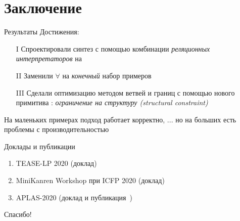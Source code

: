 \documentclass[aspectratio=169
  , xcolor={svgnames}
  , hyperref={ colorlinks,citecolor=Blue
             , linkcolor=DarkRed,urlcolor=DarkBlue}
  , russian
  ]{beamer}
\newcommand{\primi}[1]{\ensuremath{\mathbf{#1}}}
\newcommand{\ir}{\ensuremath{\mathcal{S}}}
\newcommand{\contributions}{
\begin{enumerate}
\item[I] Спроектировали синтез с помощью комбинации \emph{реляционных интерпретаторов} на \miniKanren{}
\item[II] Заменили $\forall$ на \emph{конечный} набор примеров
\item[III] Сделали оптимизацию методом ветвей и границ с помощью нового примитива \miniKanren{}: \emph{ограничение на структуру (structural constraint)}
\end{enumerate}
}
\begin{document}
\section{Заключение}

\begin{frame}{Результаты}%
Достижения: \contributions
\vspace{1em}

На маленьких примерах подход работает корректно, ... но на больших есть проблемы с производительностью 
\vspace{1em}
\end{frame}

\begin{frame}{Доклады и публикации}
\begin{enumerate}
\item TEASE-LP 2020 (доклад)
\item MiniKanren Workshop при ICFP 2020 (доклад)
\item APLAS-2020 (доклад и публикация~\cite{matchingPublication})
\end{enumerate}
\end{frame}


\begin{frame}
\begin{center}
{\Huge Спасибо!}
\end{center}
\end{frame}
\end{document}
